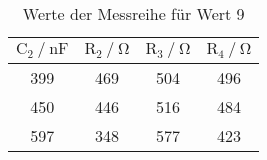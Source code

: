\begin{table}[H]
  \centering
  \caption{Werte der Messreihe für Wert 9}
  \label{tab:tabe5}
    \begin{tabular}{c c c c}
    \toprule
    $ \text{C}_2 \: / \: \si{\nano\farad} $ & $\text{R}_2 \: / \: \si{\ohm} $ &
    $\text{R}_3 \: / \: \si{\ohm} $ &
    $\text{R}_4 \: / \: \si{\ohm} $ \\
    \midrule
    399 & 469 & 504 & 496 \\
    450 & 446 & 516 & 484 \\
    597 & 348 & 577 & 423 \\
    \bottomrule
    \end{tabular}
\end{table}

